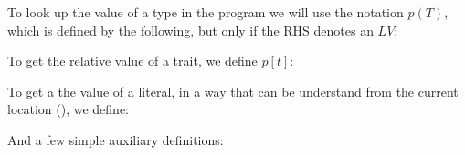 \noindent To look up the value of a type in the program we will use the notation $p(T)$, which is defined by the following, but only if the RHS denotes an $LV$:
\begin{defye}%
%
%
%
\end{defye}

\noindent To get the relative value of a trait, we define $p[t]$:
\begin{defye}%
\end{defye}

\noindent To get a the value of a literal, in a way that can be understand from the current location (), we define:
\begin{defye}%
\end{defye}

\noindent And a few simple auxiliary definitions:
\begin{defye}%
\end{defye}

\newpage

